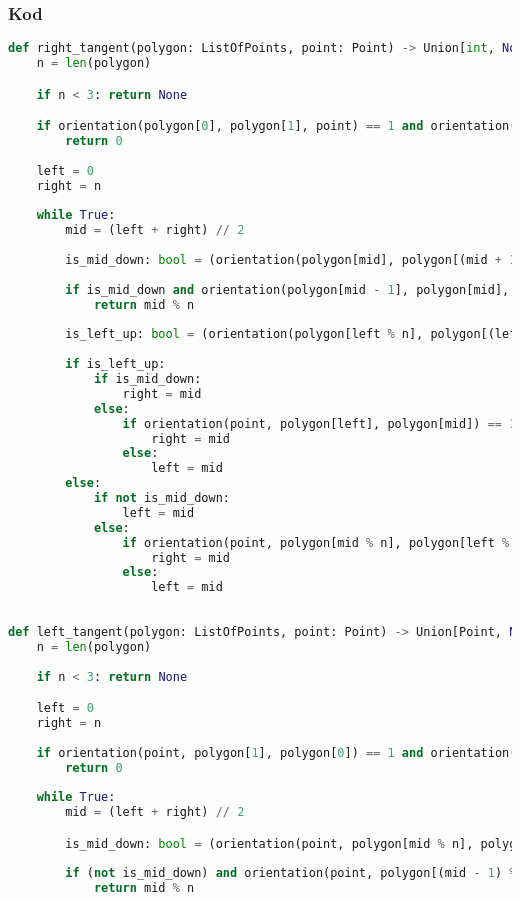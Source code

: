\documentclass[11pt]{article}
\theoremstyle{remark} \newtheorem{definition}{def.}
\theoremstyle{definition} \newtheorem{twierdzenie}{tw.}
\begin{document}
    \subsubsection{Kod}

\begin{lstlisting}[language=Python]
def right_tangent(polygon: ListOfPoints, point: Point) -> Union[int, None]:
    n = len(polygon)

    if n < 3: return None

    if orientation(polygon[0], polygon[1], point) == 1 and orientation(polygon[-1], polygon[0], point) == -1:
        return 0
    
    left = 0
    right = n
    
    while True:
        mid = (left + right) // 2
        
        is_mid_down: bool = (orientation(polygon[mid], polygon[(mid + 1) % n], point) == 1)
        
        if is_mid_down and orientation(polygon[mid - 1], polygon[mid], point) == -1: 
            return mid % n
        
        is_left_up: bool = (orientation(polygon[left % n], polygon[(left + 1) % n], point) == -1)
        
        if is_left_up:
            if is_mid_down:
                right = mid
            else:
                if orientation(point, polygon[left], polygon[mid]) == 1:
                    right = mid
                else:
                    left = mid
        else:
            if not is_mid_down:
                left = mid
            else:
                if orientation(point, polygon[mid % n], polygon[left % n]) == 1:
                    right = mid
                else:
                    left = mid
                    
    
def left_tangent(polygon: ListOfPoints, point: Point) -> Union[Point, None]:
    n = len(polygon)
    
    if n < 3: return None

    left = 0
    right = n
    
    if orientation(point, polygon[1], polygon[0]) == 1 and orientation(point, polygon[-1], polygon[0]) == 1:
        return 0
    
    while True:
        mid = (left + right) // 2

        is_mid_down: bool = (orientation(point, polygon[mid % n], polygon[(mid + 1) % n]) == 1)
        
        if (not is_mid_down) and orientation(point, polygon[(mid - 1) % n], polygon[mid % n]) == 1:
            return mid % n
        

\end{lstlisting}
\end{document}
